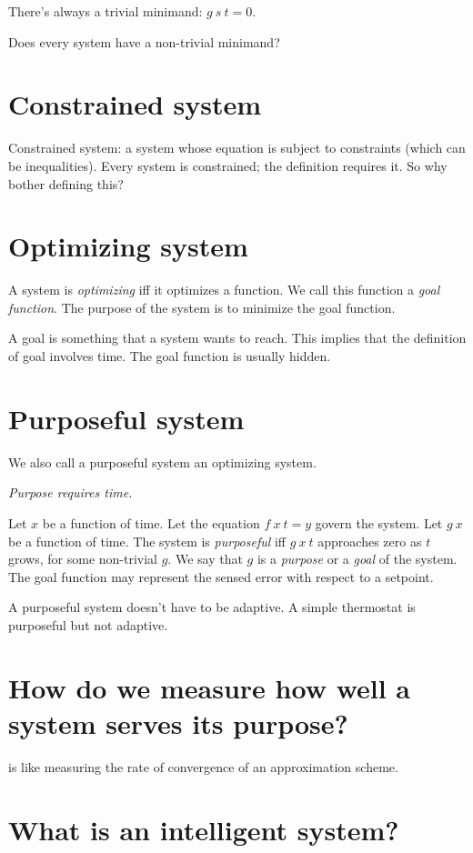 There's always a trivial minimand: \(g~s~t = 0\).

Does every system have a non-trivial minimand?

\section{Constrained system}

Constrained system: a system whose equation is subject to constraints (which can be inequalities).
Every system is constrained; the definition requires it. So why bother defining this?

\section{Optimizing system}

A system is \emph{optimizing} iff it optimizes a function.
We call this function a \emph{goal function}.
The purpose of the system is to minimize the goal function.

A goal is something that a system wants to reach.
This implies that the definition of goal involves time.
The goal function is usually hidden.

\section{Purposeful system}

We also call a purposeful system an optimizing system.

\emph{Purpose requires time.}

Let \(x\) be a function of time.
Let the equation \(f~x~t = y\) govern the system.
Let \(g~x\) be a function of time.
The system is \emph{purposeful} iff \(g~x~t\) approaches zero as \(t\) grows,
for some non-trivial \(g\).
We say that \(g\) is a \emph{purpose} or a \emph{goal} of the system.
The goal function may represent the sensed error
with respect to a setpoint.

A purposeful system doesn't have to be adaptive.
A simple thermostat is purposeful but not adaptive.

\section{How do we measure how well a system serves its purpose?}

is like measuring the rate of convergence of an approximation scheme.

\section{What is an intelligent system?}

